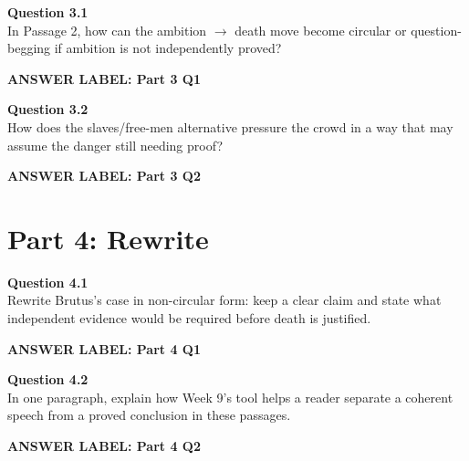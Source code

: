 \documentclass[12pt]{article}
\newcommand{\answerbox}[2]{%
\vspace{0.12em}
\noindent\textbf{#1}\par
\vspace{0.04em}
\noindent\fbox{%
\begin{minipage}[t][#2]{\dimexpr\textwidth-2\fboxsep-2\fboxrule}
\rule{\textwidth}{0pt}
\vspace{#2}
\end{minipage}}
\par\vspace{0.22em}}
\begin{document}
\textbf{Question 3.1}\\[-0.15em]
In Passage 2, how can the ambition $\rightarrow$ death move become circular or question-begging if ambition is not independently proved?

\answerbox{ANSWER LABEL: Part 3 Q1}{2.45in}

\textbf{Question 3.2}\\[-0.15em]
How does the slaves/free-men alternative pressure the crowd in a way that may assume the danger still needing proof?

\answerbox{ANSWER LABEL: Part 3 Q2}{2.45in}

\newpage

\section*{Part 4: Rewrite}

\textbf{Question 4.1}\\[-0.15em]
Rewrite Brutus's case in non-circular form: keep a clear claim and state what independent evidence would be required before death is justified.

\answerbox{ANSWER LABEL: Part 4 Q1}{2.55in}

\textbf{Question 4.2}\\[-0.15em]
In one paragraph, explain how Week 9's tool helps a reader separate a coherent speech from a proved conclusion in these passages.

\answerbox{ANSWER LABEL: Part 4 Q2}{2.45in}
\end{document}
